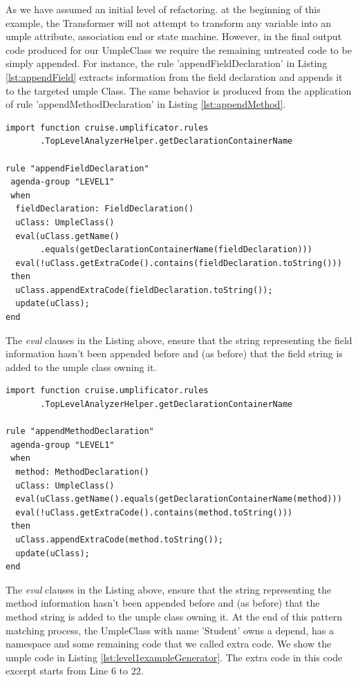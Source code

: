 As we have assumed an initial level of refactoring. at the beginning of this example, the Transformer will not attempt to transform any variable into an umple attribute, association end or state machine. However, in the final output code produced for our UmpleClass we require the remaining untreated code to be simply appended. For instance, the rule 'appendFieldDeclaration' in Listing \ref{lst:appendField} extracts information from the field declaration and appends it to the targeted umple Class. The same behavior is produced from the application of rule 'appendMethodDeclaration' in Listing \ref{lst:appendMethod}.

\begin{lstlisting}[language={drools},label={lst:appendField}, caption=Rule appendFieldDeclaration]
import function cruise.umplificator.rules
       .TopLevelAnalyzerHelper.getDeclarationContainerName
       
rule "appendFieldDeclaration"
 agenda-group "LEVEL1" 
 when
  fieldDeclaration: FieldDeclaration()
  uClass: UmpleClass()
  eval(uClass.getName()
       .equals(getDeclarationContainerName(fieldDeclaration)))
  eval(!uClass.getExtraCode().contains(fieldDeclaration.toString()))
 then
  uClass.appendExtraCode(fieldDeclaration.toString());
  update(uClass);
end
\end{lstlisting}

The \textit{eval} clauses in the Listing above, ensure that the string representing the field information hasn't been appended before and (as before) that the field string is added to the umple class owning it.

\begin{lstlisting}[language={drools},label={lst:appendMethod}, caption=Rule appendMethodDeclaration]
import function cruise.umplificator.rules
       .TopLevelAnalyzerHelper.getDeclarationContainerName
       
rule "appendMethodDeclaration"
 agenda-group "LEVEL1" 
 when
  method: MethodDeclaration()
  uClass: UmpleClass()
  eval(uClass.getName().equals(getDeclarationContainerName(method)))
  eval(!uClass.getExtraCode().contains(method.toString()))
 then
  uClass.appendExtraCode(method.toString());
  update(uClass);
end
\end{lstlisting}

The \textit{eval} clauses in the Listing above, ensure that the string representing the method information hasn't been appended before and (as before) that the method string is added to the umple class owning it. 
At the end of this pattern matching process, the UmpleClass with name 'Student' owns a depend, has a namespace and some remaining code that we called extra code. We show the umple code in Listing \ref{lst:level1exampleGenerator}. The extra code in this code excerpt starts from Line 6 to 22.

